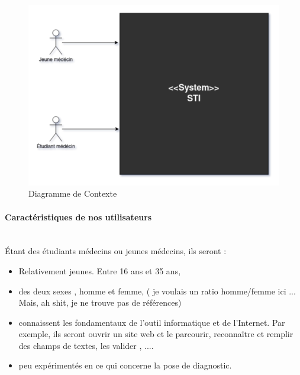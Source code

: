     \begin{figure}[H]
        \centering
        \includegraphics[width=\textwidth]{figures/context.png}
        \captionsetup{justification=centering}
        \caption{Diagramme de Contexte}
        \label{fig:uml_context}
    \end{figure}
    
    \paragraph{Caractéristiques de nos utilisateurs} \hfill \\
    Étant des étudiants médecins ou jeunes médecins, ils seront :
    \begin{itemize}
        \item Relativement jeunes. Entre 16 ans et 35 ans,
        \item des deux sexes , homme et femme, ( je voulais un ratio homme/femme ici ... Mais, ah shit, je ne trouve pas de références)
        \item connaissent les fondamentaux de l'outil informatique et de l'Internet. Par exemple, ils seront ouvrir un site web et le parcourir, reconnaître et remplir des champs de textes, les valider , ....
        
        \item peu expérimentés en ce qui concerne la pose de diagnostic.
    \end{itemize}
    
